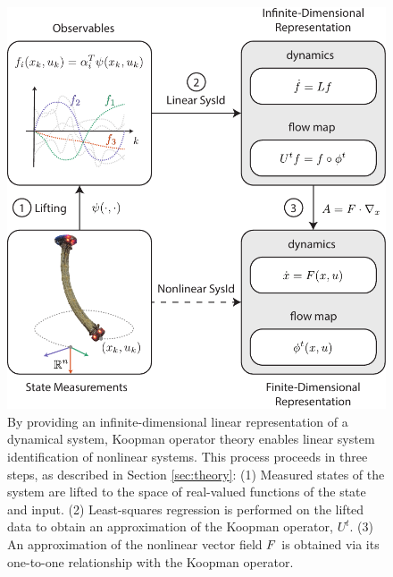 \begin{figure}[t]
    \centering
    \includegraphics[width=\linewidth]{figures/overviewDiagram_eqBigger_fixed.pdf}
    \caption{By providing an infinite-dimensional linear representation of a dynamical system, Koopman operator theory enables linear system identification of nonlinear systems. 
    This process proceeds in three steps, as described in Section \ref{sec:theory}:
    (1) Measured states of the system are lifted to the space of real-valued functions of the state and input.
    (2) Least-squares regression is performed on the lifted data to obtain an approximation of the Koopman operator, $U^t$.
    (3) An approximation of the nonlinear vector field $F$ is obtained via its one-to-one relationship with the Koopman operator.}
    \label{fig:overview}
\end{figure}


